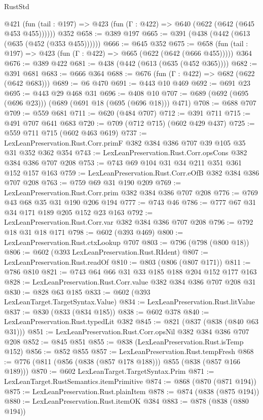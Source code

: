 \begin{lexlean}{RustStd}
\begin{coremodule}
    @421 (fun (tail : @197) => @423 (fun (Γ : @422) => @640 (@622 (@642 (@645 @453 @455))))))
    @352
@658 := @389 @197
@665 := @391 (@438 (@442 (@613 (@635 (@452 (@353 @455))))))
@666 := @645 @352
@675 := @658 (fun (tail : @197) => @423 (fun (Γ : @422) => @665 (@622 (@642 (@666 @455))))) @364
@676 := @389 @422
@681 := @438 (@442 (@613 (@635 (@452 @365))))
@682 := @391 @681
@683 := @666 @364
@688 := @676 (fun (Γ : @422) => @682 (@622 (@642 @683)))
@689 := @6 @470
@691 := @443 @10 @469
@692 := @691 @23
@695 := @443 @29 @468 @31
@696 := @408 @10
@707 := @689 (@692 (@695 (@696 @23))) (@689 (@691 @18 (@695 (@696 @18))) @471)
@708 := @688 @707
@709 := @559 @681
@711 := @620 (@484 @707)
@712 := @391 @711
@715 := @491 @707 @641 @683
@720 := @709 (@712 @715) (@602 @429 @437)
@725 := @559 @711 @715 (@602 @463 @619)
@737 := LexLeanPreservation.Rust.Corr.primF @382 @384 @386 @707 @39 @105 @35 @31 @352 @362 @354
@743 := LexLeanPreservation.Rust.Corr.opsCons @382 @384 @386 @707 @208
@753 := @743 @69 @104 @31 @34 @211 @351 @361 @152 @157 @163
@759 := LexLeanPreservation.Rust.Corr.eOfB @382 @384 @386 @707 @208
@763 := @759 @69 @31 @190 @209
@769 := LexLeanPreservation.Rust.Corr.prim @382 @384 @386 @707 @208
@776 := @769 @43 @68 @35 @31 @190 @206 @194
@777 := @743 @46
@786 := @777 @67 @31 @34 @171 @189 @205 @152 @23 @163
@792 := LexLeanPreservation.Rust.Corr.var @382 @384 @386 @707 @208
@796 := @792 @18 @31 @18 @171
@798 := @602 (@393 @469)
@800 := LexLeanPreservation.Rust.ctxLookup @707
@803 := @796 (@798 (@800 @18))
@806 := @602 (@393 LexLeanPreservation.Rust.RIdent)
@807 := LexLeanPreservation.Rust.readOf
@810 := @803 (@806 (@807 @171))
@811 := @786 @810
@821 := @743 @64 @66 @31 @33 @185 @188 @204 @152 @177 @163
@828 := LexLeanPreservation.Rust.Corr.value @382 @384 @386 @707 @208 @31
@830 := @828 @63 @185
@833 := @602 (@393 LexLeanTarget.TargetSyntax.Value)
@834 := LexLeanPreservation.Rust.litValue
@837 := @830 (@833 (@834 @185))
@838 := @602 @378
@840 := LexLeanPreservation.Rust.typedLit @382
@845 := @821 (@837 (@838 (@840 @63 @31)))
@851 := LexLeanPreservation.Rust.Corr.opsNil @382 @384 @386 @707 @208
@852 := @845 @851
@855 := @838 (LexLeanPreservation.Rust.isTemp @152)
@856 := @852 @855
@857 := LexLeanPreservation.Rust.tempFresh
@868 := @776 (@811 (@856 (@838 (@857 @178 @188))) @855 (@838 (@857 @166 @189)))
@870 := @602 LexLeanTarget.TargetSyntax.Prim
@871 := LexLeanTarget.RustSemantics.itemPrimitive
@874 := @868 (@870 (@871 @194))
@875 := LexLeanPreservation.Rust.plainItem
@878 := @874 (@838 (@875 @194))
@880 := LexLeanPreservation.Rust.itemOK @384
@883 := @878 (@838 (@880 @194))

\end{coremodule}
\end{lexlean}
